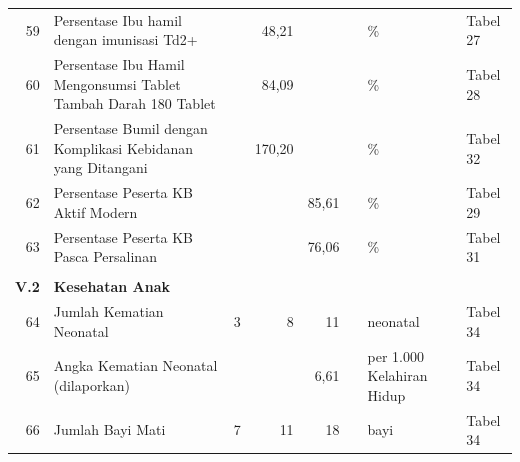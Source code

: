 \begin{small}
\begin{longtable}{rY{12em}rrrrY{5em}Y{5em}}
	 59 & Persentase Ibu hamil dengan imunisasi Td2+                                                              &        &  48,21 &         &                    & \%                             & Tabel 27 \\
	                   60 & Persentase Ibu Hamil Mengonsumsi Tablet Tambah Darah 180 Tablet                                         &        &  84,09 &         &                    & \%                             & Tabel 28 \\
	 61 & Persentase Bumil dengan Komplikasi Kebidanan yang Ditangani                                             &        & 170,20 &         &                    & \%                             & Tabel 32 \\
	                   62 & Persentase Peserta KB Aktif Modern                                                                      &        &        &   85,61 &                    & \%                             & Tabel 29 \\
	 63 & Persentase Peserta KB Pasca Persalinan                                                                  &        &        &   76,06 &                    & \%                             & Tabel 31 \\
	                      &                                                                                                         &        &        &         &                    &                                &          \\
	         \textbf{V.2} & \textbf{Kesehatan Anak}                                                                                 &        &        &         &                    &                                &          \\
	                   64 & Jumlah Kematian Neonatal                                                                                &      3 &      8 &      11 &                    & neonatal                       & Tabel 34 \\
	 65 & Angka Kematian Neonatal (dilaporkan)                                                                    &        &        &    6,61 &                    & per 1.000 Kelahiran Hidup      & Tabel 34 \\
	                   66 & Jumlah Bayi Mati                                                                                        &      7 &     11 &      18 &                    & bayi                           & Tabel 34 \\

\end{longtable}
\end{small}
